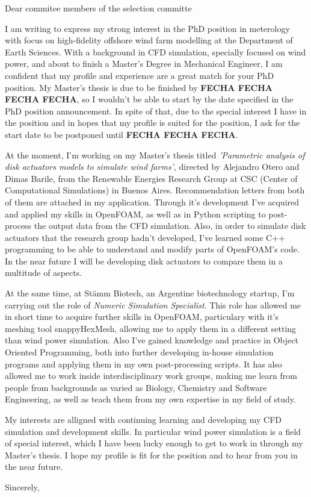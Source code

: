 \documentclass{letter}
\newcommand{\thesisname}{Parametric analysis of disk actuators models to simulate wind farms}
\begin{document}
\begin{letter}{}
\opening{Dear commitee members of the selection committe}

I am writing to express my strong interest in the PhD position in meterology with focus on high-fidelity offshore wind farm modelling at the Department of Earth Sciences.
  With a background in CFD simulation, specially focused on wind power, and about to finish a Master's Degree in Mechanical Engineer, I am confident that my profile and experience are a great match for your PhD position.
  My Master's thesis is due to be finished by \textbf{FECHA FECHA FECHA FECHA}, so I wouldn't be able to start by the date specified in the PhD position announcement.
  In spite of that, due to the special interest I have in the position and in hopes that my profile is suited for the position, I ask for the start date to be postponed until \textbf{FECHA FECHA FECHA}.

  At the moment, I'm working on my Master's thesis titled \textit{'\thesisname'}, directed by Alejandro Otero and Dimas Barile, from the Renewable Energies Research Group at CSC (Center of Computational Simulations) in Buenos Aires.
  Recommendation letters from both of them are attached in my application.
  Through it's development I've acquired and applied my skills in OpenFOAM, as well as in Python scripting to post-process the output data from the CFD simulation.
  Also, in order to simulate disk actuators that the research group hadn't developed, I've learned some C++ programming to be able to understand and modify parts of OpenFOAM's code.
  In the near future I will be developing disk actuators to compare them in a multitude of aspects.

  At the same time, at Stämm Biotech, an Argentine biotechnology startup, I'm carrying out the role of \textit{Numeric Simulation Specialist}.
  This role has allowed me in short time to acquire further skills in OpenFOAM, particulary with it's meshing tool snappyHexMesh, allowing me to apply them in a different setting than wind power simulation.
  Also I've gained knowledge and practice in Object Oriented Programming, both into further developing in-house simulation programs and applying them in my own post-processing scripts.
  It has also allowed me to work inside interdisciplinary work groups, making me learn from people from backgrounds as varied as Biology, Chemistry and Software Engineering, as well as teach them from my own expertise in my field of study.

My interests are alligned with continuing learning and developing my CFD simulation and development skills.
  In particular wind power simulation is a field of special interest, which I have been lucky enough to get to work in through my Master's thesis.
  I hope my profile is fit for the position and to hear from you in the near future.
\closing{Sincerely,}
\end{letter}
\end{document}
